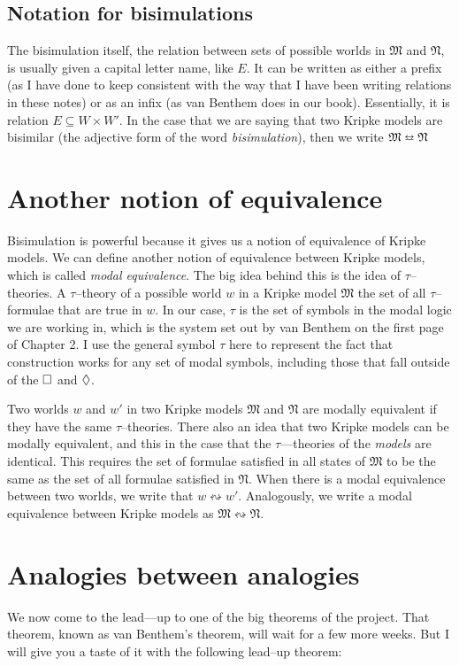 \setcounter{subsection}{-1}

\subsection{Notation for bisimulations}
The bisimulation itself, the relation between sets of possible worlds in $\mathfrak{M}$ and $\mathfrak{N}$, is usually given a 
capital letter name, like $E$. It can be written as either a prefix (as I have done to keep consistent with the way that I
have been writing relations in these notes) or as an infix (as van Benthem does in our book). Essentially, it is relation
$E \subseteq W \times W'$. In the case that we are saying that two Kripke models are bisimilar (the adjective form of the word
\emph{bisimulation}), then we write $\mathfrak{M} \leftrightarroweq \mathfrak{N}$

\section{Another notion of equivalence}
Bisimulation is powerful because it gives us a notion of equivalence of Kripke models. We can define another notion of equivalence
between Kripke models, which is called \emph{modal equivalence}. The big idea behind this is the idea of $\tau$--theories.
A $\tau$--theory of a possible world $w$ in a Kripke model $\mathfrak{M}$ the set of all $\tau$--formulae that are true in $w$.
In our case, $\tau$ is the set of symbols in the modal logic we are working in, which is the system set out by van Benthem
on the first page of Chapter 2. I use the general symbol $\tau$ here to represent the fact that construction works for any
set of modal symbols, including those that fall outside of the $\square$ and $\lozenge$.

Two worlds $w$ and $w'$ in two Kripke models $\mathfrak{M}$ and $\mathfrak{N}$ are modally equivalent if they have the same 
$\tau$--theories. There also an idea that two Kripke models can be modally equivalent, and this in the case that the $\tau$---theories
of the \emph{models} are identical. This requires the set of formulae satisfied in all states of $\mathfrak{M}$ to be
the same as the set of all formulae satisfied in $\mathfrak{N}$. When there is a modal equivalence between two worlds,
we write that $w \leftrightsquigarrow w'$. Analogously, we write a modal equivalence between Kripke models as 
$\mathfrak{M} \leftrightsquigarrow  \mathfrak{N}$.

\section{Analogies between analogies}
We now come to the lead---up to one of the big theorems of the project. That theorem, known as van Benthem's theorem, will wait
for a few more weeks. But I will give you a taste of it with the following lead--up theorem:

